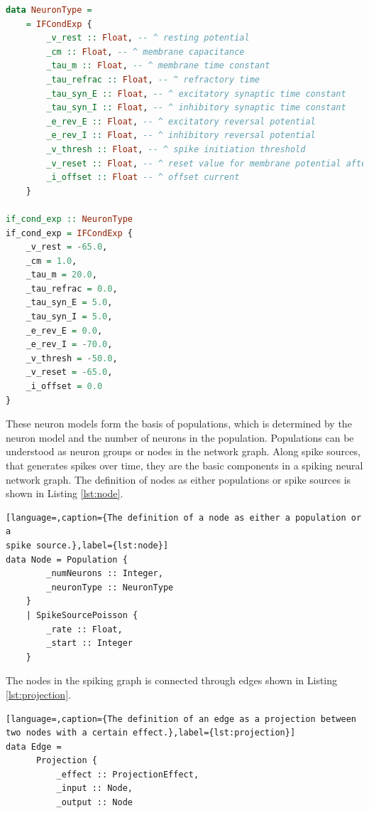 \begin{lstlisting}[language=Haskell,caption={A LIF neuron with exponential decay and
  conductance-based synapses, modelled in Haskell.},label={lst:lif-cond-exp}]
data NeuronType =
    = IFCondExp {
        _v_rest :: Float, -- ^ resting potential
        _cm :: Float, -- ^ membrane capacitance
        _tau_m :: Float, -- ^ membrane time constant
        _tau_refrac :: Float, -- ^ refractory time
        _tau_syn_E :: Float, -- ^ excitatory synaptic time constant
        _tau_syn_I :: Float, -- ^ inhibitory synaptic time constant
        _e_rev_E :: Float, -- ^ excitatory reversal potential
        _e_rev_I :: Float, -- ^ inhibitory reversal potential
        _v_thresh :: Float, -- ^ spike initiation threshold
        _v_reset :: Float, -- ^ reset value for membrane potential after a spike
        _i_offset :: Float -- ^ offset current
    }

if_cond_exp :: NeuronType
if_cond_exp = IFCondExp {
    _v_rest = -65.0,
    _cm = 1.0,
    _tau_m = 20.0,
    _tau_refrac = 0.0,
    _tau_syn_E = 5.0,
    _tau_syn_I = 5.0,
    _e_rev_E = 0.0,
    _e_rev_I = -70.0,
    _v_thresh = -50.0,
    _v_reset = -65.0,
    _i_offset = 0.0
}
\end{lstlisting}

These neuron models form the basis of populations, which is determined by the
neuron model and the number of neurons in the population.
Populations can be understood as neuron groups or nodes in the network graph.
Along spike sources, that generates spikes over time, they are the 
basic components in a spiking neural network graph.
The definition of nodes as either populations or spike sources is shown in
Listing \ref{lst:node}.

\begin{lstlisting}[language=,caption={The definition of a node as either a population or a
spike source.},label={lst:node}]
data Node = Population {
        _numNeurons :: Integer,
        _neuronType :: NeuronType
    }
    | SpikeSourcePoisson {
        _rate :: Float,
        _start :: Integer
    }
\end{lstlisting}

The nodes in the spiking graph is connected through edges shown in 
Listing \ref{lst:projection}.

\begin{lstlisting}[language=,caption={The definition of an edge as a projection between
two nodes with a certain effect.},label={lst:projection}]
data Edge =
      Projection {
          _effect :: ProjectionEffect,
          _input :: Node,
          _output :: Node
\end{lstlisting}

